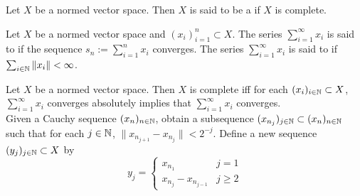 \documentclass{book}
\begin{document}
	\begin{defn} \ld{}
		Let $X$ be a normed vector space. Then $X$ is said to be a  if $X$ is complete.  
	\end{defn}
	
	\begin{defn} \ld{}
		Let $X$ be a normed vector space and $(x_i)_{i=1}^n \subset X$. The series $\sum_{i =1}^{\infty}x_i$ is said to  if the sequence $s_n := \sum_{i=1}^n x_i$ converges. The series $\sum_{i =1}^{\infty}x_i$ is said to  if $\sum_{i\in \mathbb{N}}\|x_i \|< \infty$.
	\end{defn}
	
	\begin{ex} \lex{}
		Let $X$ be a normed vector space. Then $X$ is complete iff for each $(x_{i})_{i \in \mathbb{N}} \subset X$, $\sum_{i =1}^{\infty}x_i$ converges absolutely implies that $\sum_{i=1}^{\infty}x_i$ converges. \\
		 Given a Cauchy sequence $(x_n)_{n \in \mathbb{N}}$, obtain a subsequence $(x_{n_j})_{j \in \mathbb{N}} \subset (x_n)_{n \in \mathbb{N}}$ such that for each $j \in \mathbb{N}$, $\|x_{n_{j+1}} - x_{n_{j}}\| < 2^{-j}$. Define a new sequence $(y_j)_{j \in \mathbb{N}} \subset X$ by 
		\[
		y_j = 
		\begin{cases}
		x_{n_1} & j =1 \\  
		x_{n_j} - x_{n_{j-1}} & j \geq 2	
		\end{cases}
		\] 
	\end{ex}
	
\end{document}
